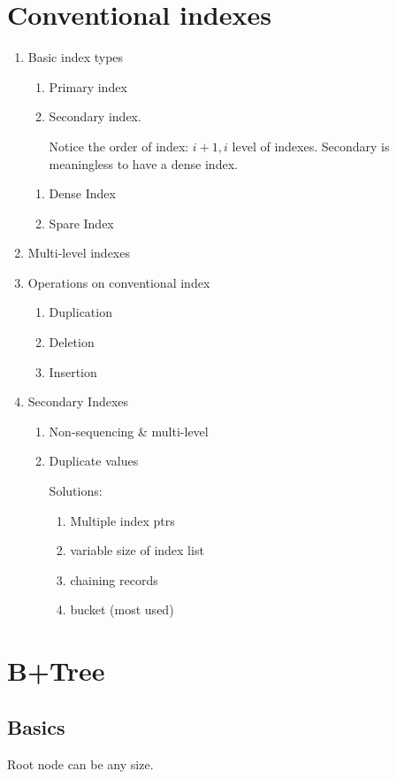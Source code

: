 \documentclass[a4paper]{report}
\begin{document}
\section{Conventional indexes}
\begin{enumerate}
\item Basic index types
  \begin{enumerate}
  \item Primary index
  \item Secondary index. 

  Notice the order of index: $i+1, i$ level of indexes. Secondary is meaningless to have a dense index. 
  
  
  
  \end{enumerate}
  \begin{enumerate}
  \item Dense Index
  \item Spare Index
  \end{enumerate}
\item Multi-level indexes
\item Operations on conventional index
  \begin{enumerate}
  \item Duplication
  \item Deletion
  \item Insertion
  \end{enumerate}
\item Secondary Indexes
  \begin{enumerate}
  \item Non-sequencing \& multi-level
  \item Duplicate values
  
  Solutions:
    \begin{enumerate}
    \item Multiple index ptrs
    \item variable size of index list 
    \item chaining records 
    \item bucket (most used)
    \end{enumerate}
  \end{enumerate}
\end{enumerate}
\section{B+Tree}
\subsection{Basics}
Root node can be any size. 
\end{document}
